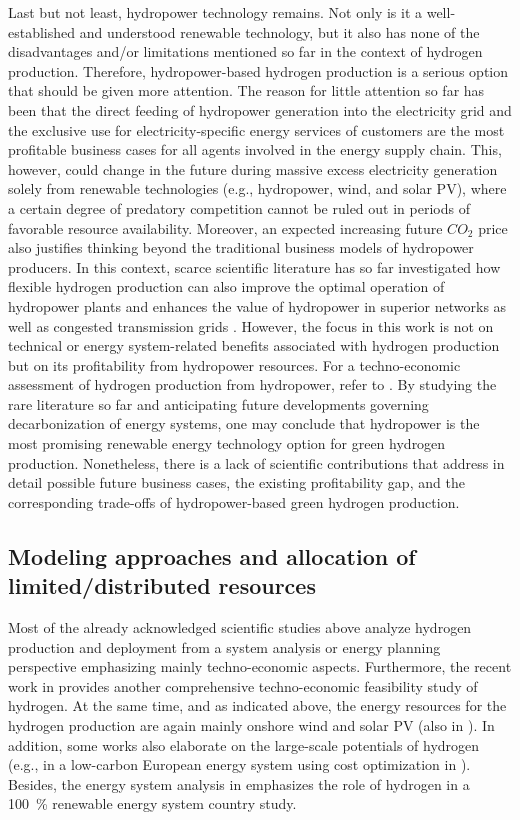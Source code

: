 \documentclass[review]{elsarticle}
\begin{document}
Last but not least, hydropower technology remains. Not only is it a well-established and understood renewable technology, but it also has none of the disadvantages and/or limitations mentioned so far in the context of hydrogen production. Therefore, hydropower-based hydrogen production is a serious option that should be given more attention. The reason for little attention so far has been that the direct feeding of hydropower generation into the electricity grid and the exclusive use for electricity-specific energy services of customers are the most profitable business cases for all agents involved in the energy supply chain. This, however, could change in the future during massive excess electricity generation solely from renewable technologies (e.g., hydropower, wind, and solar PV), where a certain degree of predatory competition cannot be ruled out in periods of favorable resource availability. Moreover, an expected increasing future $CO_2$ price also justifies thinking beyond the traditional business models of hydropower producers. In this context, scarce scientific literature has so far investigated how flexible hydrogen production can also improve the optimal operation of hydropower plants \cite{lu2015optimal} and enhances the value of hydropower in superior networks as well as congested transmission grids \cite{bodal2020value}. However, the focus in this work is not on technical or energy system-related benefits associated with hydrogen production but on its profitability from hydropower resources. For a techno-economic assessment of hydrogen production from hydropower, refer to \cite{olateju2016techno}. By studying the rare literature so far and anticipating future developments governing decarbonization of energy systems, one may conclude that hydropower is the most promising renewable energy technology option for green hydrogen production. Nonetheless, there is a lack of scientific contributions that address in detail possible future business cases, the existing profitability gap, and the corresponding trade-offs of hydropower-based green hydrogen production.

\subsection{Modeling approaches and allocation of limited/distributed resources}\label{state3}
Most of the already acknowledged scientific studies above analyze hydrogen production and deployment from a system analysis or energy planning perspective emphasizing mainly techno-economic aspects. Furthermore, the recent work in \cite{qolipour2017techno} provides another comprehensive techno-economic feasibility study of hydrogen. At the same time, and as indicated above, the energy resources for the hydrogen production are again mainly onshore wind and solar PV (also in \cite{wu2020cooperative}). In addition, some works also elaborate on the large-scale potentials of hydrogen (e.g., in a low-carbon European energy system using cost optimization in \cite{blanco2018potential}). Besides, the energy system analysis in \cite{lund2009energy} emphasizes the role of hydrogen in a \SI{100}{\%} renewable energy system country study.\vspace{0.3cm}
\end{document}
